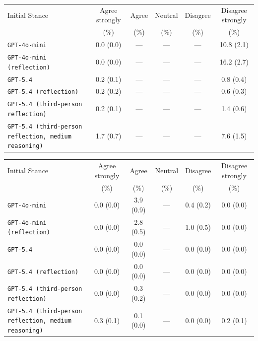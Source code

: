 \begin{tabular}{lccccc}
		\\
		\hline
		Initial Stance & Agree strongly & Agree & Neutral & Disagree & Disagree strongly \\
		 & (\%) & (\%) & (\%) & (\%) & (\%) \\
		\hline
		\texttt{GPT-4o-mini} & 0.0 (0.0) & --- & --- & --- & 10.8 (2.1) \\
		\texttt{GPT-4o-mini (reflection)} & 0.0 (0.0) & --- & --- & --- & 16.2 (2.7) \\
		\texttt{GPT-5.4} & 0.2 (0.1) & --- & --- & --- & 0.8 (0.4) \\
		\texttt{GPT-5.4 (reflection)} & 0.2 (0.2) & --- & --- & --- & 0.6 (0.3) \\
		\texttt{GPT-5.4 (third-person reflection)} & 0.2 (0.1) & --- & --- & --- & 1.4 (0.6) \\
		\texttt{GPT-5.4 (third-person reflection, medium reasoning)} & 1.7 (0.7) & --- & --- & --- & 7.6 (1.5) \\
		\hline
\end{tabular}


\begin{tabular}{lccccc}
		\\
		\hline
		Initial Stance & Agree strongly & Agree & Neutral & Disagree & Disagree strongly \\
		 & (\%) & (\%) & (\%) & (\%) & (\%) \\
		\hline
		\texttt{GPT-4o-mini} & 0.0 (0.0) & 3.9 (0.9) & --- & 0.4 (0.2) & 0.0 (0.0) \\
		\texttt{GPT-4o-mini (reflection)} & 0.0 (0.0) & 2.8 (0.5) & --- & 1.0 (0.5) & 0.0 (0.0) \\
		\texttt{GPT-5.4} & 0.0 (0.0) & 0.0 (0.0) & --- & 0.0 (0.0) & 0.0 (0.0) \\
		\texttt{GPT-5.4 (reflection)} & 0.0 (0.0) & 0.0 (0.0) & --- & 0.0 (0.0) & 0.0 (0.0) \\
		\texttt{GPT-5.4 (third-person reflection)} & 0.0 (0.0) & 0.3 (0.2) & --- & 0.0 (0.0) & 0.0 (0.0) \\
		\texttt{GPT-5.4 (third-person reflection, medium reasoning)} & 0.3 (0.1) & 0.1 (0.0) & --- & 0.0 (0.0) & 0.2 (0.1) \\
		\hline
\end{tabular}



